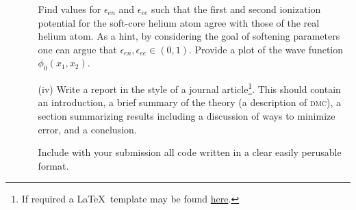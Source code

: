 \documentclass[letterpaper, 11 pt]{article}
\begin{document}
\begin{itemize}
\begin{itemize}
            Find values for $\epsilon_{en}$ and $\epsilon_{ee}$ such that the first and second
            ionization potential for the soft-core helium atom agree with those of the real helium atom.
            As a hint, by considering the goal of softening parameters one can argue that
            $\epsilon_{en}, \epsilon_{ee} \in (0,1)$. Provide a plot of the wave function
            $\phi_0(x_1, x_2)$.

         \item[(iv)] Write a report in the style of a journal article\footnote{If required a \LaTeX\
            template may be found \href{https://journals.aps.org/revtex}{here}.}. This should contain an
            introduction, a brief summary of the theory (a  description of \textsc{dmc}), a section
            summarizing results including a discussion of ways to minimize error, and a conclusion.

            Include with your submission all code written in a clear easily perusable format.

      \end{itemize}

\end{itemize}

\printbibliography[title=References]
\end{document}
